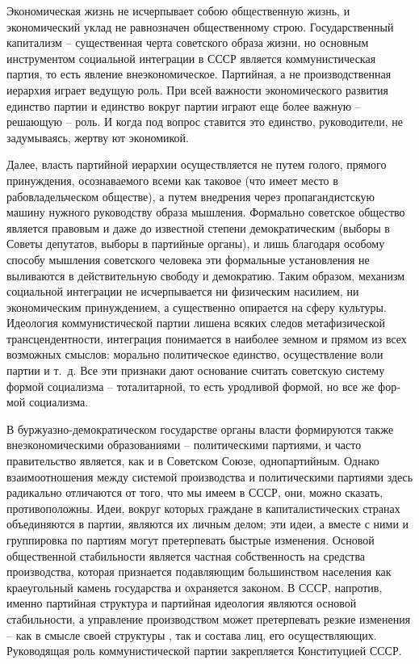 \documentclass{book}
\begin{document}
Экономическая жизнь не исчерпывает собою общественную жизнь, и экономический уклад не равнозначен общественному строю. Государственный капитализм -- существенная черта советского образа жизни, но основным инструментом социальной интеграции в СССР является коммунистическая партия, то есть явление внеэкономическое. Партийная, а не производственная иерархия играет ведущую роль. При всей важности экономического развития единство партии и единство вокруг партии играют еще более важную -- решающую -- роль. И ког­да под вопрос ставится это единство, руководители, не заду­мываясь, жертву ют экономикой.

Далее, власть партийной иерархии осуществляется не путем голого, прямого принуждения, осознаваемого всеми как тако­вое (что имеет место в рабовладельческом обществе), а путем внедрения через пропагандистскую машину нужного руко­водству образа мышления. Формально советское общество является правовым и даже до известной степени демократи­ческим (выборы в Советы депутатов, выборы в партийные органы), и лишь благодаря особому способу мышления совет­ского человека эти формальные установления не выливаются в действительную свободу и демократию. Таким образом, ме­ханизм социальной интеграции не исчерпывается ни физиче­ским насилием, ни экономическим принуждением, а существен­но опирается на сферу культуры. Идеология коммунистиче­ской партии лишена всяких следов метафизической трансцен­дентности, интеграция понимается в наиболее земном и пря­мом из всех возможных смыслов: морально политическое единство, осуществление воли партии и т.~д. Все эти признаки дают основание считать советскую систему формой социализ­ма -- 
тоталитарной, то есть уродливой формой, но все же фор­мой социализма.

В буржуазно-демократическом государстве органы власти формируются также внеэкономическими образованиями -- политическими партиями, и часто правительство является, как и в Советском Союзе, однопартийным. Однако взаимоотношения между системой производства и политическими партия­ми здесь радикально отличаются от того, что мы имеем в СССР, они, можно сказать, противоположны. Идеи, вокруг которых граждане в капиталистических странах объединяются в партии, являются их личным делом; эти идеи, а вместе с ними и группи­ровка по партиям могут претерпевать быстрые изменения. Основой общественной стабильности является частная собст­венность на средства производства, которая признается подав­ляющим большинством населения как краеугольный камень государства и охраняется законом. В СССР, напротив, именно партийная структура и партийная идеология являются основой стабильности, а управление производством может претерпе­вать резкие изменения -- как в смысле своей структуры , так и состава лиц, его осуществляющих. Руководящая 
роль комму­нистической партии закрепляется Конституцией СССР.
\end{document}
